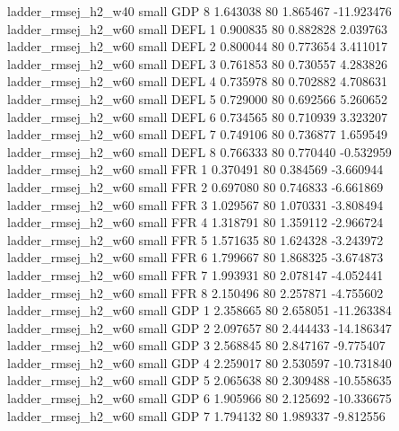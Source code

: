      ladder_rmsej_h2_w40      small      GDP                 8 1.643038 80       1.865467         -11.923476
     ladder_rmsej_h2_w60      small     DEFL                 1 0.900835 80       0.882828           2.039763
     ladder_rmsej_h2_w60      small     DEFL                 2 0.800044 80       0.773654           3.411017
     ladder_rmsej_h2_w60      small     DEFL                 3 0.761853 80       0.730557           4.283826
     ladder_rmsej_h2_w60      small     DEFL                 4 0.735978 80       0.702882           4.708631
     ladder_rmsej_h2_w60      small     DEFL                 5 0.729000 80       0.692566           5.260652
     ladder_rmsej_h2_w60      small     DEFL                 6 0.734565 80       0.710939           3.323207
     ladder_rmsej_h2_w60      small     DEFL                 7 0.749106 80       0.736877           1.659549
     ladder_rmsej_h2_w60      small     DEFL                 8 0.766333 80       0.770440          -0.532959
     ladder_rmsej_h2_w60      small      FFR                 1 0.370491 80       0.384569          -3.660944
     ladder_rmsej_h2_w60      small      FFR                 2 0.697080 80       0.746833          -6.661869
     ladder_rmsej_h2_w60      small      FFR                 3 1.029567 80       1.070331          -3.808494
     ladder_rmsej_h2_w60      small      FFR                 4 1.318791 80       1.359112          -2.966724
     ladder_rmsej_h2_w60      small      FFR                 5 1.571635 80       1.624328          -3.243972
     ladder_rmsej_h2_w60      small      FFR                 6 1.799667 80       1.868325          -3.674873
     ladder_rmsej_h2_w60      small      FFR                 7 1.993931 80       2.078147          -4.052441
     ladder_rmsej_h2_w60      small      FFR                 8 2.150496 80       2.257871          -4.755602
     ladder_rmsej_h2_w60      small      GDP                 1 2.358665 80       2.658051         -11.263384
     ladder_rmsej_h2_w60      small      GDP                 2 2.097657 80       2.444433         -14.186347
     ladder_rmsej_h2_w60      small      GDP                 3 2.568845 80       2.847167          -9.775407
     ladder_rmsej_h2_w60      small      GDP                 4 2.259017 80       2.530597         -10.731840
     ladder_rmsej_h2_w60      small      GDP                 5 2.065638 80       2.309488         -10.558635
     ladder_rmsej_h2_w60      small      GDP                 6 1.905966 80       2.125692         -10.336675
     ladder_rmsej_h2_w60      small      GDP                 7 1.794132 80       1.989337          -9.812556
